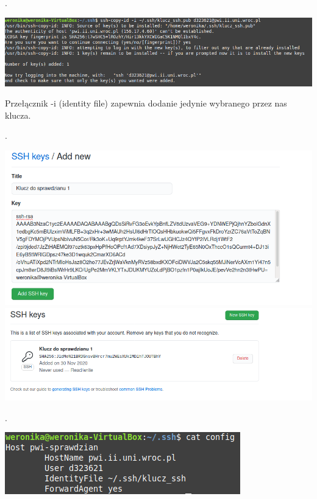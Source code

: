 \documentclass[a4paper]{article}
\begin{document}
.

\begin{center}
    \includegraphics[scale=0.5]{2_2.png}

    \noindent Przełącznik -i (identity file) zapewnia dodanie jedynie wybranego przez nas klucza.

\end{center}

.

\begin{center}
    \includegraphics[scale=0.4]{2_3.png}
    \includegraphics[scale=0.4]{2_31.png}

\end{center}

.

\begin{center}
    \includegraphics[scale=0.4]{2_4.png}
\end{center}
\end{document}

